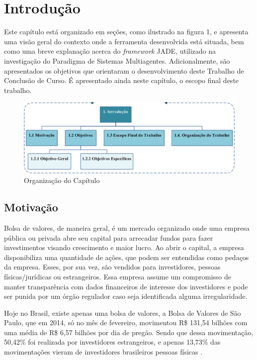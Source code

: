 \chapter[INTRODUÇÃO]{Introdução}

Este capítulo está organizado em seções, como ilustrado na figura 1, e apresenta uma visão geral do contexto onde a ferramenta desenvolvida está situada, bem como uma breve explanação acerca do \textit{framework} JADE, utilizado na investigação do Paradigma de Sistemas Multiagentes. Adicionalmente, são apresentados os objetivos que orientaram o desenvolvimento deste Trabalho de Conclusão de Curso. É apresentado ainda neste capítulo, o escopo final deste trabalho.

\begin{figure}[h!]
\centering
\label{f10}
\includegraphics[width=1\textwidth]{figuras/cap1}
\caption{Organização do Capítulo}
\end{figure}
\FloatBarrier

\section{Motivação}


Bolsa de valores, de maneira geral, é um mercado organizado onde uma empresa pública ou privada abre seu capital para arrecadar fundos para fazer investimentos visando crescimento e maior lucro. Ao abrir o capital, a empresa disponibiliza uma quantidade de ações, que podem ser entendidas como pedaços da empresa. Esses, por sua vez, são vendidos para investidores, pessoas físicas/jurídicas ou estrangeiros. Essa empresa assume um compromisso de manter transparência com dados financeiros de interesse dos investidores e pode ser punida por um órgão regulador caso seja identificada alguma irregularidade.

Hoje no Brasil, existe apenas uma bolsa de valores, a Bolsa de Valores de São Paulo, que em 2014, só no mês de fevereiro, movimentou R\$ 131,54 bilhões com uma média de R\$ 6,57 bilhões por dia de pregão. Sendo que dessa movimentação, 50,42\% foi realizada por investidores estrangeiros, e apenas 13,73\% das movimentações vieram de investidores brasileiros pessoas físicas \cite{bovespa2014}.

